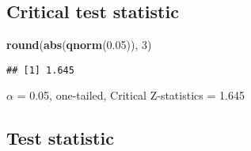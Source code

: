 \documentclass[
]{article}
\newenvironment{Shaded}{\begin{snugshade}}{\end{snugshade}}
\newcommand{\DecValTok}[1]{\textcolor[rgb]{0.00,0.00,0.81}{#1}}
\newcommand{\FloatTok}[1]{\textcolor[rgb]{0.00,0.00,0.81}{#1}}
\newcommand{\KeywordTok}[1]{\textcolor[rgb]{0.13,0.29,0.53}{\textbf{#1}}}
\newcommand{\NormalTok}[1]{#1}
\begin{document}
\hypertarget{critical-test-statistic}{%
\subsection{Critical test statistic}\label{critical-test-statistic}}

\begin{Shaded}
\begin{Highlighting}[]
\KeywordTok{round}\NormalTok{(}\KeywordTok{abs}\NormalTok{(}\KeywordTok{qnorm}\NormalTok{(}\FloatTok{0.05}\NormalTok{)), }\DecValTok{3}\NormalTok{)}
\end{Highlighting}
\end{Shaded}

\begin{verbatim}
## [1] 1.645
\end{verbatim}

\(\alpha\) = 0.05, one-tailed, Critical Z-statistics = 1.645

\hypertarget{test-statistic}{%
\subsection{Test statistic}\label{test-statistic}}
\end{document}
